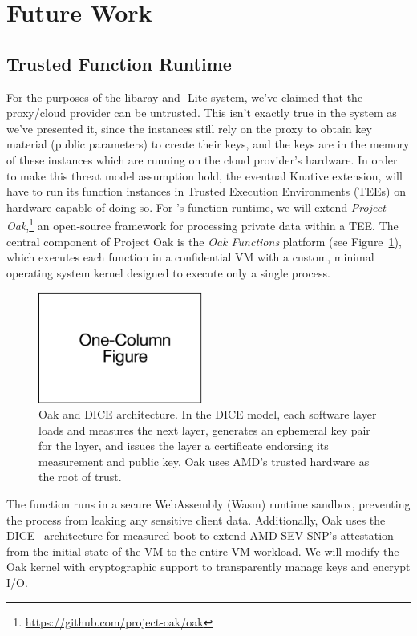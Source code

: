 \section{Future Work}
\label{sec:future}

\subsection{Trusted Function Runtime}

For the purposes of the \SystemName libaray and \SystemName-Lite system, we've claimed that the proxy/cloud provider can be untrusted.
This isn't exactly true in the system as we've presented it, since the instances still rely on the proxy to obtain key material (public parameters) to create their keys, and the keys are in the memory of these instances which are running on the cloud provider's hardware.
In order to make this threat model assumption hold, the eventual Knative \SystemName extension, will have to run its function instances in Trusted Execution Environments (TEEs) on hardware capable of doing so.
%
For \SystemName's function runtime, we will extend \emph{Project Oak},\footnote{
\url{https://github.com/project-oak/oak}
}
an open-source framework for processing private data within a TEE\@.
%
The central component of Project Oak is the \emph{Oak Functions} platform (see
Figure~\ref{fig:oak}), which executes each function in a confidential VM with a
custom, minimal operating system kernel designed to execute only a single
process.
%
\begin{figure}
    \centering
    \includegraphics[page = 3, width=0.48\textwidth]{diagrams/slides.pdf}
    \caption{Oak and DICE architecture.
    In the DICE model, each software layer loads and measures the next layer,
    generates an ephemeral key pair for the layer, and issues the layer a
    certificate endorsing its measurement and public key.
    Oak uses AMD's trusted hardware as the root of trust.
    }
    \label{fig:oak}
\end{figure}
%
The function runs in a secure WebAssembly (Wasm) runtime sandbox, preventing
the process from leaking any sensitive client data.
%
Additionally, Oak uses the DICE~\cite{24-misc-dice} architecture for measured
boot to extend AMD SEV-SNP's attestation from the initial state of the VM
to the entire VM workload.
%
We will modify the Oak kernel with cryptographic support to transparently
manage keys and encrypt I/O\@.



